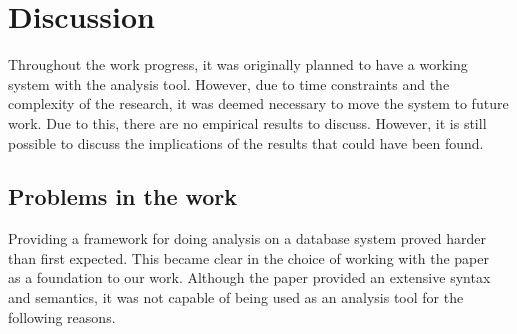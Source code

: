 \section{Discussion}\label{sec:discussion}



Throughout the work progress, it was originally planned to have a working system with the analysis tool.
However,
due to time constraints and the complexity of the research,
it was deemed necessary to move the system to future work.
Due to this, there are no empirical results to discuss.
However, it is still possible to discuss the implications of the results that could have been found.


\subsection{Problems in the work}\label{subsec:workproblems}
Providing a framework for doing analysis on a database system proved harder than first expected.
This became clear in the choice of working with the paper~\cite{halder_abstract_2012} as a foundation to our work.
Although the paper provided an extensive syntax and semantics, it was not capable of being used as an analysis tool for the following reasons.

